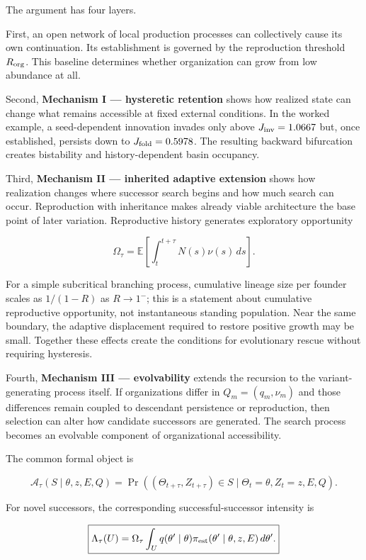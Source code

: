 \documentclass[11pt,a4paper]{article}
\begin{document}
The argument has four layers.

First, an open network of local production processes can collectively
cause its own continuation. Its establishment is governed by the
reproduction threshold \(R_{\rm org}\). This baseline determines whether
organization can grow from low abundance at all.

Second, \textbf{Mechanism I --- hysteretic retention} shows how realized
state can change what remains accessible at fixed external conditions.
In the worked example, a seed-dependent innovation invades only above
\(J_{\rm inv}=1.0667\) but, once established, persists down to
\(J_{\rm fold}=0.5978\). The resulting backward bifurcation creates
bistability and history-dependent basin occupancy.

Third, \textbf{Mechanism II --- inherited adaptive extension} shows how
realization changes where successor search begins and how much search
can occur. Reproduction with inheritance makes already viable
architecture the base point of later variation. Reproductive history
generates exploratory opportunity

\[
\Omega_\tau
=
\mathbb E\!\left[
\int_t^{t+\tau}N(s)\nu(s)\,ds
\right].
\]

For a simple subcritical branching process, cumulative lineage size per
founder scales as \(1/(1-R)\) as \(R\to1^-\); this is a statement about
cumulative reproductive opportunity, not instantaneous standing
population. Near the same boundary, the adaptive displacement required
to restore positive growth may be small. Together these effects create
the conditions for evolutionary rescue without requiring hysteresis.

Fourth, \textbf{Mechanism III --- evolvability} extends the recursion to
the variant-generating process itself. If organizations differ in
\(Q_m=(q_m,\nu_m)\) and those differences remain coupled to descendant
persistence or reproduction, then selection can alter how candidate
successors are generated. The search process becomes an evolvable
component of organizational accessibility.

The common formal object is

\[
\boxed{
\mathcal A_\tau(S\mid\theta,z,E,Q)
=
\Pr\!\left(
(\Theta_{t+\tau},Z_{t+\tau})\in S
\mid
\Theta_t=\theta,
Z_t=z,
E,Q
\right).
}
\]

For novel successors, the corresponding successful-successor intensity
is

\[
\boxed{
\Lambda_\tau(U)
=
\Omega_\tau
\int_U
q(\theta'\mid\theta)
\pi_{\rm est}(\theta'\mid\theta,z,E)
\,d\theta'.
}
\]
\end{document}
